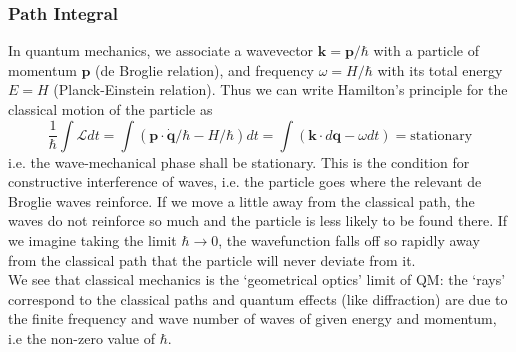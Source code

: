 \documentclass[a4paper]{article}
\theoremstyle{new}
\begin{document}
\subsubsection*{Path Integral}
In quantum mechanics, we associate a wavevector $\mathbf{k} = \mathbf{p}/\hbar$ with a particle of momentum $\mathbf{p}$ (de Broglie relation), and frequency $\omega=H/\hbar$ with its total energy $E = H$ (Planck-Einstein relation). Thus we can write Hamilton’s principle for the classical motion of the particle as
$$\frac{1}{\hbar}\int \mathcal{L}dt=\int(\mathbf{p}\cdot\mathbf{\dot{q}}/\hbar-H/\hbar)dt=\int(\mathbf{k}\cdot d\mathbf{q}-\omega dt)=\text{stationary}$$
i.e. the wave-mechanical phase shall be stationary. This is the condition for constructive interference of waves, i.e. the particle goes where the relevant de Broglie waves reinforce. If we move a little away from the classical path, the waves do not reinforce so much and the particle is less likely to be found there. If we imagine taking the limit $\hbar\rightarrow0$, the wavefunction falls off so rapidly away from the classical path that the particle will never deviate from it.\\[5pt]
We see that classical mechanics is the `geometrical optics' limit of QM: the `rays' correspond to the classical paths and quantum effects (like diffraction) are due to the finite frequency and wave number of waves of given energy and momentum, i.e the non-zero value of $\hbar$.
\newpage
\end{document}
